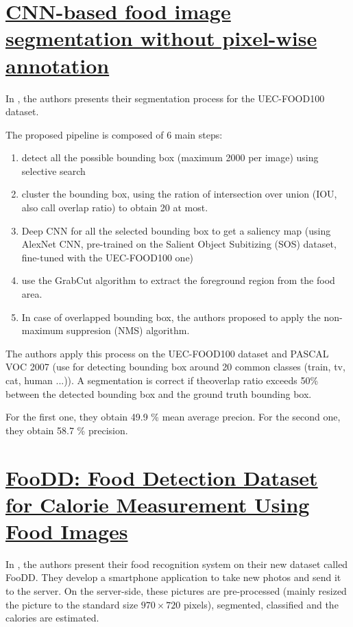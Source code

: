 \section{\href{http://link.springer.com/chapter/10.1007/978-3-319-23222-5_55}{CNN-based food image segmentation without pixel-wise annotation}}

In \cite{Shimoda2015}, the authors presents their segmentation process for the UEC-FOOD100 dataset.

The proposed pipeline is composed of 6 main steps:
\begin{enumerate}
    \item detect all the possible bounding box (maximum 2000 per image) using selective search
    \item cluster the bounding box, using the ration of intersection over union (IOU, also call overlap ratio) to obtain 20 at most.
    \item Deep CNN for all the selected bounding box to get a saliency map (using AlexNet CNN, pre-trained on the Salient Object Subitizing (SOS) dataset, fine-tuned with the UEC-FOOD100 one)
    \item use the GrabCut algorithm to extract the foreground region from the food area. 
    \item In case of overlapped bounding box, the authors proposed to apply the non-maximum suppresion (NMS) algorithm.
\end{enumerate}

The authors apply this process on the UEC-FOOD100 dataset and PASCAL VOC 2007 (use for detecting bounding box around 20 common classes (train, tv, cat, human ...)).
A segmentation is correct if theoverlap ratio exceeds 50\% between the detected bounding box and the ground truth bounding box.

For the first one, they obtain 49.9 \% mean average precion.
For the second one, they obtain 58.7 \% precision.

\section{\href{http://link.springer.com/chapter/10.1007/978-3-319-23222-5_54}{FooDD: Food Detection Dataset for Calorie Measurement Using Food Images}}

In \cite{ParisaPouladzadehAbdulsalamYassine2015}, the authors present their food recognition system on their new dataset called FooDD.
They develop a smartphone application to take new photos and send it to the server. On the server-side, these pictures are pre-processed (mainly resized the picture to the standard size $970 \times 720$ pixels), segmented, classified and the calories are estimated.

